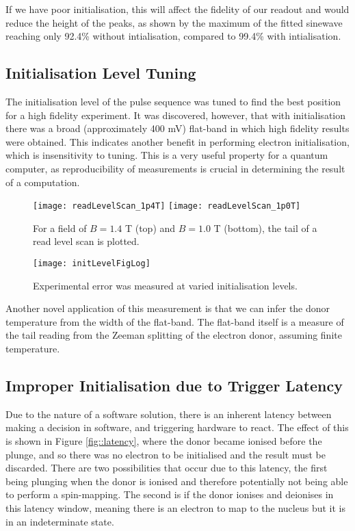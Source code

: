 	If we have poor initialisation, this will affect the fidelity of our readout and would reduce the height of the peaks, as shown by the maximum of the fitted sinewave reaching only 92.4\% without intialisation, compared to 99.4\% with intialisation.

\subsection{Initialisation Level Tuning}
	The initialisation level of the pulse sequence was tuned to find the best position for a high fidelity experiment. It was discovered, however, that with initialisation there was a broad (approximately 400 mV) flat-band in which high fidelity results were obtained. This indicates another benefit in performing electron initialisation, which is insensitivity to tuning. This is a very useful property for a quantum computer, as reproducibility of measurements is crucial in determining the result of a computation.
%	
	\begin{figure}[htbp!]
		\flushleft
		\texttt{[image: readLevelScan\_1p4T]}
		\texttt{[image: readLevelScan\_1p0T]}
		\caption{For a field of $B = 1.4$ T (top) and $B = 1.0$ T (bottom), the tail of a read level scan is plotted.}
		\label{fig::readLevel}
	\end{figure}
	
	\begin{figure}[htbp!]
		\centering
		\texttt{[image: initLevelFigLog]}
		\caption{Experimental error was measured at varied initialisation levels.}
		\label{fig::initLevel}
	\end{figure}
	
	Another novel application of this measurement is that we can infer the donor temperature from the width of the flat-band. The flat-band itself is a measure of the tail reading from the Zeeman splitting of the electron donor, assuming finite temperature.

\subsection{Improper Initialisation due to Trigger Latency}
	\label{sec::latency}
	Due to the nature of a software solution, there is an inherent latency between making a decision in software, and triggering hardware to react. The effect of this is shown in Figure \ref{fig::latency}, where the donor became ionised before the plunge, and so there was no electron to be initialised and the result must be discarded. There are two possibilities that occur due to this latency, the first being plunging when the donor is ionised and therefore potentially not being able to perform a spin-mapping. The second is if the donor ionises and deionises in this latency window, meaning there is an electron to map to the nucleus but it is in an indeterminate state.
	
